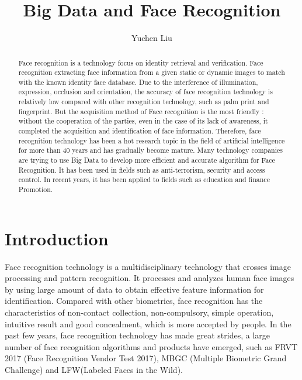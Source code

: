 \documentclass[sigconf]{acmart}
\begin{document}
\title{Big Data and Face Recognition}


\author{Yuchen Liu}




\begin{abstract}
Face recognition is a technology focus on identity retrieval and verification.  Face recognition extracting face information from a given static or dynamic images to match with the known identity face database. Due to the interference of illumination, expression, occlusion and orientation, the accuracy of face recognition technology is relatively low compared with other recognition technology, such as palm print and fingerprint. But the acquisition method of Face recognition is the most friendly : without the cooperation of the parties, even in the case of its lack of awareness, it completed the acquisition and identification of face information. Therefore, face recognition technology has been a hot research topic in the field of artificial intelligence for more than 40 years and has gradually become mature.  Many technology companies are trying to use Big Data to develop more efficient and accurate algorithm for Face Recognition. It has been used in fields such as anti-terrorism, security and access control. In recent years, it has been applied to fields such as education and finance Promotion.
\end{abstract}



\maketitle

\section{Introduction}
Face recognition technology is a multidisciplinary technology that crosses image processing and pattern recognition.  It processes and analyzes human face images by using large amount of data to obtain effective feature information for identification. Compared with other biometrics, face recognition has the characteristics of non-contact collection, non-compulsory, simple operation, intuitive result and good concealment, which is more accepted by people. In the past few years, face recognition technology has made great strides, a large number of face recognition algorithms and products have emerged, such as FRVT 2017 (Face Recognition Vendor Test 2017), MBGC (Multiple Biometric Grand Challenge) and LFW(Labeled Faces in the Wild). 
\end{document}
